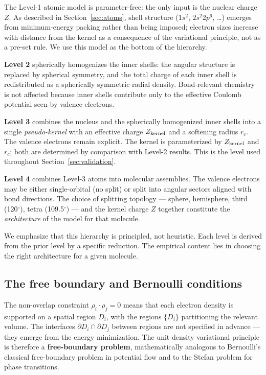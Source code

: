 \documentclass[11pt]{article}
\begin{document}
The Level-1 atomic model is parameter-free: the only input is the nuclear charge $Z$. As described in Section~\ref{sec:atoms}, shell structure ($1s^2$, $2s^2 2p^6$, \ldots) emerges from minimum-energy packing rather than being imposed; electron sizes increase with distance from the kernel as a consequence of the variational principle, not as a pre-set rule. We use this model as the bottom of the hierarchy.

\textbf{Level 2} spherically homogenizes the inner shells: the angular structure is replaced by spherical symmetry, and the total charge of each inner shell is redistributed as a spherically symmetric radial density. Bond-relevant chemistry is not affected because inner shells contribute only to the effective Coulomb potential seen by valence electrons.

\textbf{Level 3} combines the nucleus and the spherically homogenized inner shells into a single \emph{pseudo-kernel} with an effective charge $Z_{\rm kernel}$ and a softening radius $r_c$. The valence electrons remain explicit. The kernel is parameterized by $Z_{\rm kernel}$ and $r_c$; both are determined by comparison with Level-2 results. This is the level used throughout Section~\ref{sec:validation}.

\textbf{Level 4} combines Level-3 atoms into molecular assemblies. The valence electrons may be either single-orbital (no split) or split into angular sectors aligned with bond directions. The choice of splitting topology --- sphere, hemisphere, third (120$^\circ$), tetra (109.5$^\circ$) --- and the kernel charge $Z$ together constitute the \emph{architecture} of the model for that molecule.

We emphasize that this hierarchy is principled, not heuristic. Each level is derived from the prior level by a specific reduction. The empirical content lies in choosing the right architecture for a given molecule.

\subsection{The free boundary and Bernoulli conditions}\label{sec:bernoulli}

The non-overlap constraint $\rho_i \cdot \rho_j = 0$ means that each electron density is supported on a spatial region $D_i$, with the regions $\{D_i\}$ partitioning the relevant volume. The interfaces $\partial D_i \cap \partial D_j$ between regions are not specified in advance --- they emerge from the energy minimization. The unit-density variational principle is therefore a \textbf{free-boundary problem}, mathematically analogous to Bernoulli's classical free-boundary problem in potential flow and to the Stefan problem for phase transitions.
\end{document}

